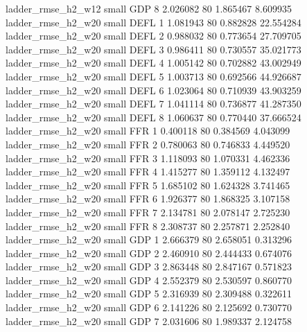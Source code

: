       ladder_rmse_h2_w12      small      GDP                 8 2.026082 80       1.865467           8.609935
      ladder_rmse_h2_w20      small     DEFL                 1 1.081943 80       0.882828          22.554284
      ladder_rmse_h2_w20      small     DEFL                 2 0.988032 80       0.773654          27.709705
      ladder_rmse_h2_w20      small     DEFL                 3 0.986411 80       0.730557          35.021773
      ladder_rmse_h2_w20      small     DEFL                 4 1.005142 80       0.702882          43.002949
      ladder_rmse_h2_w20      small     DEFL                 5 1.003713 80       0.692566          44.926687
      ladder_rmse_h2_w20      small     DEFL                 6 1.023064 80       0.710939          43.903259
      ladder_rmse_h2_w20      small     DEFL                 7 1.041114 80       0.736877          41.287350
      ladder_rmse_h2_w20      small     DEFL                 8 1.060637 80       0.770440          37.666524
      ladder_rmse_h2_w20      small      FFR                 1 0.400118 80       0.384569           4.043099
      ladder_rmse_h2_w20      small      FFR                 2 0.780063 80       0.746833           4.449520
      ladder_rmse_h2_w20      small      FFR                 3 1.118093 80       1.070331           4.462336
      ladder_rmse_h2_w20      small      FFR                 4 1.415277 80       1.359112           4.132497
      ladder_rmse_h2_w20      small      FFR                 5 1.685102 80       1.624328           3.741465
      ladder_rmse_h2_w20      small      FFR                 6 1.926377 80       1.868325           3.107158
      ladder_rmse_h2_w20      small      FFR                 7 2.134781 80       2.078147           2.725230
      ladder_rmse_h2_w20      small      FFR                 8 2.308737 80       2.257871           2.252840
      ladder_rmse_h2_w20      small      GDP                 1 2.666379 80       2.658051           0.313296
      ladder_rmse_h2_w20      small      GDP                 2 2.460910 80       2.444433           0.674076
      ladder_rmse_h2_w20      small      GDP                 3 2.863448 80       2.847167           0.571823
      ladder_rmse_h2_w20      small      GDP                 4 2.552379 80       2.530597           0.860770
      ladder_rmse_h2_w20      small      GDP                 5 2.316939 80       2.309488           0.322611
      ladder_rmse_h2_w20      small      GDP                 6 2.141226 80       2.125692           0.730770
      ladder_rmse_h2_w20      small      GDP                 7 2.031606 80       1.989337           2.124758
